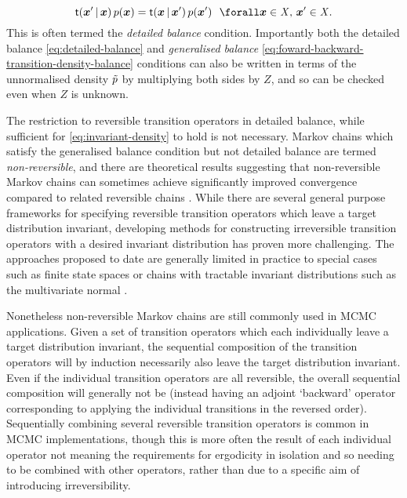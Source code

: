 \begin{equation}\label{eq:detailed-balance}
  \trans(\vct{x}'\gvn\vct{x}) \,\tgtdens(\vct{x}) = 
  \trans(\vct{x}\gvn\vct{x}') \,\tgtdens(\vct{x}')
  ~~\forall \vct{x} \in \set{X},\, \vct{x}' \in \set{X}.
\end{equation}
This is often termed the \emph{detailed balance} condition. Importantly both the detailed balance \eqref{eq:detailed-balance} and \emph{generalised balance} \eqref{eq:foward-backward-transition-density-balance} conditions can also be written in terms of the unnormalised density $\tilde{p}$ by multiplying both sides by $Z$, and so can be checked even when $Z$ is unknown.

The restriction to reversible transition operators in detailed balance, while sufficient for \eqref{eq:invariant-density} to hold is not necessary. Markov chains which satisfy the generalised balance condition but not detailed balance are termed \emph{non-reversible}, and there are theoretical results suggesting that non-reversible Markov chains can sometimes achieve significantly improved convergence compared to related reversible chains \citep{diaconis2000analysis,neal2004improving,ichiki2013violation}. While there are several general purpose frameworks for specifying reversible transition operators which leave a target distribution invariant, developing methods for constructing irreversible transition operators with a desired invariant distribution has proven more challenging. The approaches proposed to date are generally limited in practice to special cases such as finite state spaces \citep{suwa2010markov,turitsyn2011irreversible,sun2010improving} or chains with tractable invariant distributions such as the multivariate normal \citep{bierkens2016non}. 

Nonetheless non-reversible Markov chains are still commonly used in \ac{MCMC} applications. Given a set of transition operators which each individually leave a target distribution invariant, the sequential composition of the transition operators will by induction necessarily also leave the target distribution invariant. Even if the individual transition operators are all reversible, the overall sequential composition will generally not be (instead having an adjoint `backward' operator corresponding to applying the individual transitions in the reversed order). Sequentially combining several reversible transition operators is common in \ac{MCMC} implementations, though this is more often the result of each individual operator not meaning the requirements for ergodicity in isolation and so needing to be combined with other operators, rather than due to a specific aim of introducing irreversibility.

